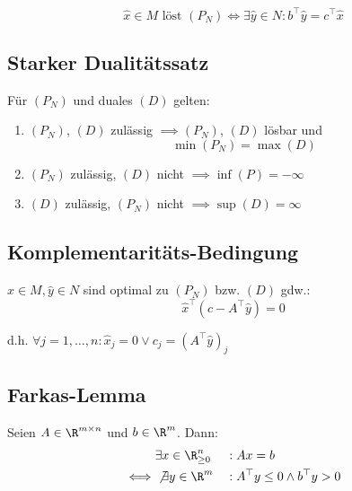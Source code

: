 \[\hat x \in M \text{ löst } (P_N) \iff \exists \hat y \in N : b^\top \hat y = c^\top \hat x\]

\subsection*{Starker Dualitätssatz}

Für \((P_N)\) und duales \((D)\) gelten:

\begin{enumerate}[label=(\alph*)]
	\item \((P_N)\), \((D)\) zulässig \(\implies (P_N)\), \((D)\) lösbar und \[\min (P_N) = \max (D)\]
	\item \((P_N)\) zulässig, \((D)\) nicht \(\implies \inf (P) = -\infty\)
	\item \((D)\) zulässig, \((P_N)\) nicht \(\implies \sup (D) = \infty\)
\end{enumerate}

\subsection*{Komplementaritäts-Bedingung}

\(\hat x \in M, \hat y \in N\) sind optimal zu \((P_N)\) bzw. \((D)\) gdw.:
\[\hat x^\top (c-A^\top \hat y) = 0\]

d.h. \(\forall j = 1,\dots,n : \hat x_j = 0 \lor c_j = (A^\top \hat y)_j\)

\subsection*{Farkas-Lemma}

Seien \(A \in \R^{m \times n}\) und \(b \in \R^m\). Dann:
\begin{align*}
&\exists x \in \R_{\geq 0}^n &&: Ax=b \\
\iff &\not\exists y \in \R^m &&: A^\top y \leq 0 \land b^\top y > 0
\end{align*}